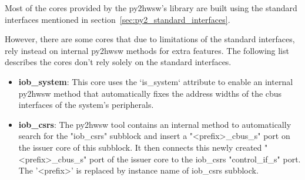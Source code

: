 %

Most of the cores provided by the py2hwsw's library are built using the standard interfaces mentioned in section~\ref{sec:py2_standard_interfaces}.

However, there are some cores that due to limitations of the standard interfaces, rely instead on internal py2hwsw methods for extra features.
The following list describes the cores don't rely solely on the standard interfaces.

\begin{itemize}
\item \textbf{iob\_system}: This core uses the `is\_system` attribute to enable an internal py2hwsw method that automatically fixes the address widths of the cbus interfaces of the system's peripherals.
\item \textbf{iob\_csrs}: The py2hwsw tool contains an internal method to automatically search for the "iob\_csrs" subblock and insert a "\textless prefix\textgreater \_cbus\_s" port on the issuer core of this subblock. It then connects this newly created "\textless prefix\textgreater \_cbus\_s" port of the issuer core to the iob\_csrs "control\_if\_s" port. The '\textless prefix\textgreater ' is replaced by instance name of iob\_csrs subblock.
\end{itemize}



